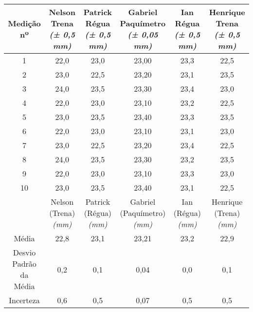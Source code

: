\documentclass{article}
\begin{document}
\begin{table}[h!]
\centering
\begin{tabular}{c c c c c c }
\toprule
Medição nº & \shortstack{Nelson\\Trena\\\textit{(± 0,5 mm)}} & \shortstack{Patrick\\Régua\\\textit{(± 0,5 mm)}} & \shortstack{Gabriel\\Paquímetro\\\textit{(± 0,05 mm)}} & \shortstack{Ian\\Régua\\\textit{(± 0,5 mm)}} & \shortstack{Henrique\\Trena\\\textit{(± 0,5 mm)}}\\
\midrule
1 & 22,0 & 23,0 & 23,00 & 23,3 & 22,5\\
2 & 23,0 & 22,5 & 23,20 & 23,1 & 23,5\\
3 & 24,0 & 23,5 & 23,30 & 23,4 & 23,0\\
4 & 22,0 & 23,0 & 23,10 & 23,2 & 22,5\\
5 & 23,0 & 23,5 & 23,40 & 23,3 & 23,5\\
6 & 22,0 & 23,0 & 23,10 & 23,1 & 23,0\\
7 & 23,0 & 22,5 & 23,20 & 23,4 & 22,5\\
8 & 24,0 & 23,5 & 23,30 & 23,2 & 23,5\\
9 & 22,0 & 23,0 & 23,10 & 23,3 & 23,0\\
10 & 23,0 & 23,5 & 23,40 & 23,1 & 22,5\\
\midrule
&\shortstack{Nelson\\(Trena)\\\textit{(mm)}} & \shortstack{Patrick\\(Régua)\\\textit{(mm)}} & \shortstack{Gabriel\\(Paquímetro)\\\textit{(mm)}} & \shortstack{Ian\\(Régua)\\\textit{(mm)}} & \shortstack{Henrique\\(Trena)\\\textit{(mm)}}\\
\midrule
Média & 22,8 & 23,1 & 23,21 & 23,2 & 22,9\\[3pt]
\shortstack{Desvio\\Padrão da\\Média} & 0,2 & 0,1 & 0,04 & 0,0 & 0,1\\[3pt]
Incerteza & 0,6 & 0,5 & 0,07 & 0,5 & 0,5\\
\bottomrule
\end{tabular}
\end{table}
\end{document}
